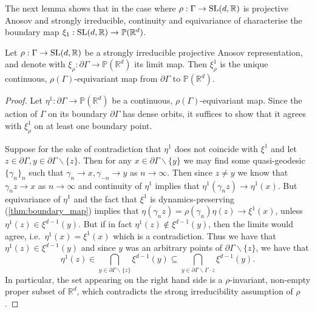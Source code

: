 \documentclass{report}
\begin{document}
The next lemma shows that in the case where $\rho: \Gamma \to \operatorname{{\mathrm{SL}}}(d, \mathbb R)$ is projective Anosov and strongly irreducible, continuity and equivariance of  characterise the boundary map $\xi_1: \operatorname{{\mathrm{SL}}}(d, \mathbb R) \to \mathbb P(\mathbb R^d)$.
\begin{lemma}\label{lem:equivariance_uniqueness}
    Let $\rho: \Gamma \to \operatorname{{\mathrm{SL}}}(d, \mathbb R) $ be a strongly irreducible projective Anosov representation, and denote with $\xi_\rho: \partial \Gamma \to \mathbb P(\mathbb R^d)$ its limit map.
    Then $\xi^1_\rho$ is the unique continuous, $\rho(\Gamma)$-equivariant map from $\partial \Gamma$ to $\mathbb P(\mathbb R^d)$.
\end{lemma}
\begin{proof}
    Let $\eta^1: \partial \Gamma \to \mathbb P(\mathbb R^d)$ be a continuous, $\rho(\Gamma)$-equivariant map.
    Since the action of $\Gamma$ on its boundary $\partial \Gamma$ has dense orbits, it suffices to show that it agrees with $\xi^1_\rho$ on at least one boundary point.

    Suppose for the sake of contradiction that $\eta^1$ does not coincide with $ \xi^1$ and let $z \in \partial \Gamma, y \in \partial \Gamma \backslash \{z\}$.
    Then for any $x \in \partial \Gamma \backslash \{y \}$ we may find some quasi-geodesic $\{\gamma_n\}_n$ such that $\gamma_n \to x, \gamma_{-n} \to y$ as $n \to \infty$.
    Then since $z \neq y$ we know that $\gamma_n z \to x$ as $n \to \infty$ and continuity of $\eta^1$ implies that $\eta^1(\gamma_n z) \to \eta^1(x)$.
    But equivariance of $\eta^1$ and the fact that $\xi^1$ is dynamics-preserving (\cref{thm:boundary_map}) implies that $\eta(\gamma_n z) = \rho(\gamma_n) \eta(z) \to \xi^1(x)$,
    unless $\eta^1(z) \in \xi^{d-1}(y)$.
    But if in fact $\eta^1(z) \not \in \xi^{d-1}(y)$, then the limits would agree, i.e.\ $\eta^1(x) = \xi^1(x)$ which is a contradiction.
    Thus we have that $\eta^1(z) \in \xi^{d-1}(y)$ and since $y$ was an arbitrary points of $\partial \Gamma \backslash \{z\}$, we have that
    \[
    \eta^1(z) \in \bigcap_{y \in \partial \Gamma \backslash \{z\}} \xi^{d-1}(y) \subseteq 
    \bigcap_{y \in \partial \Gamma \backslash \Gamma \cdot z} \xi^{d-1}(y).
    \] 
    In particular, the set appearing on the right hand side is a $\rho$-invariant, non-empty proper subset of $\mathbb R^d$, which contradicts the strong irreducibility assumption of $\rho$.
\end{proof}
\end{document}
